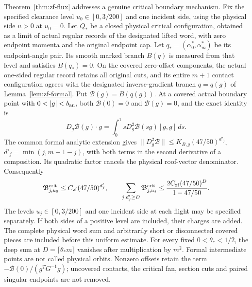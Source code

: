 Theorem~\ref{thm:zf-flux} addresses a genuine critical boundary
mechanism. Fix the specified clearance level $u_0\in[0,3/200]$ and
one incident side, using the physical side $u>0$ at $u_0=0$.
Let $Q_*$ be a closed physical critical configuration, obtained as
a limit of actual regular records of the designated lifted word,
with zero endpoint momenta and the original endpoint cap. Let
$q_*=(\alpha_0^*,\alpha_m^*)$ be its endpoint-angle pair.
Its smooth marked branch $B(q)$ is measured from that level and
satisfies $B(q_*)=0$. On the covered zero-offset components,
the actual one-sided regular record retains all original cuts,
and its entire $m+1$ contact configuration agrees with the designated
inverse-gradient branch $q=q(g)$ of Lemma~\ref{lem:zf-formal}.
Put $\mathcal B(g)=B(q(g))$. At a covered actual boundary point with
$0<|g|<b_{\rm an}$, both $\mathcal B(0)=0$ and
$\mathcal B(g)=0$, and the exact identity is
\[
 D_g\mathcal B(g)\cdot g
       =\int_0^1sD_g^2\mathcal B(sg)[g,g]\,ds .
\]
The common formal analytic extension gives
$\|D_g^2\mathcal B\|\le K_{B,g}(47/50)^{d'_j}$,
$d'_j=\min(j,m-1-j)$, with both terms in the second derivative
of a composition. Its quadratic factor cancels
the physical roof-vector denominator. Consequently
\[
 \mathfrak B^{\rm crit}_{j,u_0}\le C_{\rm zf}(47/50)^{d'_j},
 \qquad
 \sum_{j:d'_j\ge D}\mathfrak B^{\rm crit}_{j,u_j}
       \le {2C_{\rm zf}(47/50)^D\over1-47/50}.
\]
The levels $u_j\in[0,3/200]$ and one incident side at each flight
may be specified separately. If both sides of a positive level
are included, their charges are added.
The complete physical word sum and arbitrarily short or disconnected
covered pieces are included before this uniform estimate.
For every fixed $0<\theta_*<1/2$, the deep sum at
$D=\lceil\theta_*m\rceil$ vanishes after multiplication by $m^2$.
Formal intermediate points are not called physical orbits.
Nonzero offsets retain the term $-\mathcal B(0)/(g^TG^{-1}g)$;
uncovered contacts, the critical fan, section cuts and paired
singular endpoints are not removed.

